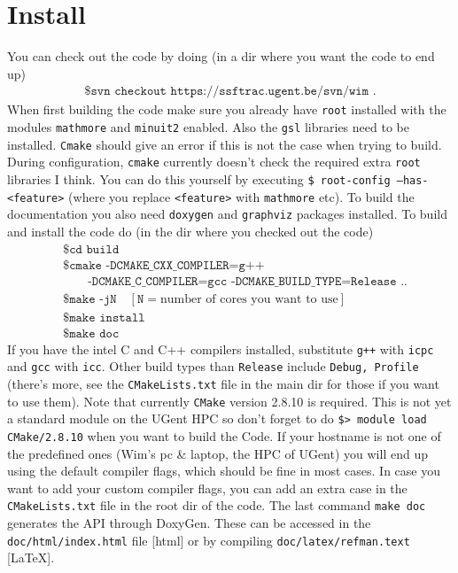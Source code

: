 \section{Install}
You can check out the code by doing (in a dir where you want the code to end up)
\begin{align*}
	\texttt{\$ svn checkout https://ssftrac.ugent.be/svn/wim .}
\end{align*}
When first building the code make sure you already have \texttt{root} installed 
with the modules \texttt{mathmore} and 
\texttt{minuit2} enabled.  Also the \texttt{gsl} libraries need to be 
installed. \texttt{Cmake} should give an error if this is not the case when 
trying to build. During configuration, \texttt{cmake} currently doesn't check 
the required extra \texttt{root} libraries I think.  You can do this yourself 
by executing \texttt{\$ root-config --has-<feature>} (where you replace 
\texttt{<feature>} with \texttt{mathmore} etc). To build the documentation you 
also need \texttt{doxygen} and \texttt{graphviz} packages installed. To build 
and install the code do (in the dir where you checked 
out the code)
\begin{align*}
    & \texttt{\$ cd build} \\
	& \texttt{\$ cmake -DCMAKE\_CXX\_COMPILER=g++}\\
 &\qquad \texttt{-DCMAKE\_C\_COMPILER=gcc 
-DCMAKE\_BUILD\_TYPE=Release ..} \\
	& \texttt{\$ make -jN}\quad [\texttt{N}= \text{number of cores you want 
to use}]\\
	& \texttt{\$ make install } \\
	& \texttt{\$ make doc } 
\end{align*}
If you have the intel C and C++ compilers installed, substitute \texttt{g++} 
with \texttt{icpc} and \texttt{gcc} with \texttt{icc}.  Other build types than 
\texttt{Release} include \texttt{Debug, Profile} (there's more, see the 
\texttt{CMakeLists.txt} file in the main dir for those if you want to use 
them). 
Note that currently \texttt{CMake} version 2.8.10 is required. This is not yet a 
standard module on the UGent HPC so don't forget to do \texttt{\$> module load 
CMake/2.8.10} when you want to build the Code.  If your hostname is not one of 
the predefined ones (Wim's pc \& laptop, the HPC of UGent) you will end up 
using the default compiler flags, which should be fine in most cases.  In case 
you want to add your custom compiler flags, you can add an extra case in the 
\texttt{CMakeLists.txt} file in the root dir of the code.  The last command 
\texttt{make doc} generates the API through DoxyGen.  These can be accessed in 
the \texttt{doc/html/index.html} file [html] or by compiling 
\texttt{doc/latex/refman.text} [\LaTeX].

